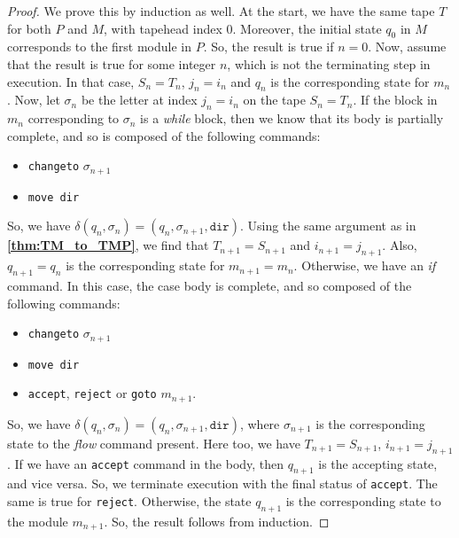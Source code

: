 \documentclass{article}
\theoremstyle{definition}
\begin{document}
    \begin{proof}
        We prove this by induction as well. At the start, we have the same tape $T$ for both $P$ and $M$, with tapehead index $0$. Moreover, the initial state $q_0$ in $M$ corresponds to the first module in $P$. So, the result is true if $n = 0$. Now, assume that the result is true for some integer $n$, which is not the terminating step in execution. In that case, $S_n = T_n$, $j_n = i_n$ and $q_n$ is the corresponding state for $m_n$. Now, let $\sigma_n$ be the letter at index $j_n = i_n$ on the tape $S_n = T_n$. If the block in $m_n$ corresponding to $\sigma_n$ is a \textit{while} block, then we know that its body is partially complete, and so is composed of the following commands:
        \begin{itemize}
            \item \texttt{changeto} $\sigma_{n+1}$
            \item \texttt{move dir}
        \end{itemize}
        So, we have $\delta(q_n, \sigma_n) = (q_n, \sigma_{n+1}, \texttt{dir})$. Using the same argument as in \textbf{\ref{thm:TM_to_TMP}}, we find that $T_{n+1} = S_{n+1}$ and $i_{n+1} = j_{n+1}$. Also, $q_{n+1} = q_n$ is the corresponding state for $m_{n+1} = m_n$. Otherwise, we have an \textit{if} command. In this case, the case body is complete, and so composed of the following commands:
        \begin{itemize}
            \item \texttt{changeto} $\sigma_{n+1}$
            \item \texttt{move dir}
            \item \texttt{accept}, \texttt{reject} or \texttt{goto} $m_{n+1}$.
        \end{itemize}
        So, we have $\delta(q_n, \sigma_n) = (q_n, \sigma_{n+1}, \texttt{dir})$, where $\sigma_{n+1}$ is the corresponding state to the \textit{flow} command present. Here too, we have $T_{n+1} = S_{n+1}$, $i_{n+1} = j_{n+1}$. If we have an \texttt{accept} command in the body, then $q_{n+1}$ is the accepting state, and vice versa. So, we terminate execution with the final status of \texttt{accept}. The same is true for \texttt{reject}. Otherwise, the state $q_{n+1}$ is the corresponding state to the module $m_{n+1}$. So, the result follows from induction.
    \end{proof}
\end{document}
